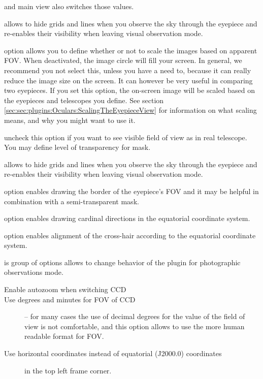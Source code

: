 \begin{description}
\begin{description}
     and main view also switches those values.
   \item[Hide grids and lines when enabled] allows to hide grids and lines when you observe the sky through the eyepiece and re-enables their visibility when leaving visual observation mode.
   \item[Scale image circle] option allows you to define whether or not to scale the images based on apparent FOV. When deactivated, the image circle will fill your screen. 
         In general, we recommend you not select this, unless you have a need to, because it can really reduce the image size on the screen. 
		 It can however be very useful in comparing two eyepieces. 
		 If you set this option, the  on-screen image will be scaled based on the eyepieces and telescopes you define. 
		 See section \ref{sec:sec:plugins:Oculars:ScalingTheEyepieceView} for information on what scaling means, and why you might want to use it.
   \item[Use semi-transparent mask] uncheck this option if you want to see visible field of view as in real telescope. You may define level of transparency for mask.
   \item[Hide grids and lines when enabled] allows to hide grids and lines when you observe the sky through the eyepiece and re-enables their visibility when leaving visual observation mode.
   \item[Show FOV outline] option enables drawing the border of the eyepiece's FOV and it may be helpful in combination with a semi-transparent mask.
   \item[Show compass rose] option enables drawing cardinal directions in the equatorial coordinate system.
   \item[Align crosshair] option enables alignment of the cross-hair according to the equatorial coordinate system.
 \end{description}
\item[Sensor view] is group of options allows to change behavior of the plugin for photographic observations mode.
  \begin{description}
  \item[Enable autozoom when switching CCD]  
  \item[Use degrees and minutes for FOV of CCD] -- for many cases the use of decimal degrees for the value of the field of view is not comfortable, and this option allows to use the more human readable format for FOV.
  \item[Use horizontal coordinates instead of equatorial (J2000.0) coordinates] in the top left frame corner.

\end{description}
\end{description}
